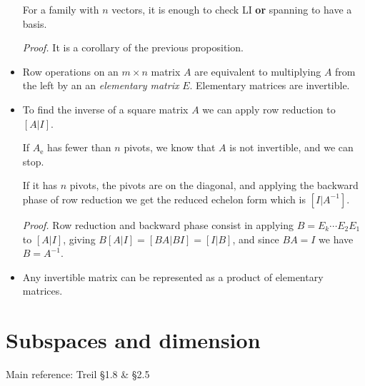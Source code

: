 \documentclass[11pt]{article}
\newcommand{\1}{\mathbf{1}}
\newcommand{\e}{{\mathrm{e}}}
\newcommand{\0}{\mathbf{0}}
\begin{document}
\begin{itemize}
For a family with $n$ vectors, it is enough to check LI \textbf{or} spanning to have a basis.

\emph{Proof.}
It is a corollary of the previous proposition.

\item

Row operations on an $m \times n$ matrix $A$ are equivalent to multiplying $A$ from the left by an an \emph{elementary matrix} $E$.
Elementary matrices are invertible.

\item

To find the inverse of a square matrix $A$ we can apply row reduction to $[A|I]$.

If $A_\e$ has fewer than $n$ pivots, we know that $A$ is not invertible, and we can stop.

If it has $n$ pivots, the pivots are on the diagonal, and applying the backward phase of row reduction we get the reduced echelon form which is $[I|A^{-1}]$.

\emph{Proof.}
Row reduction and backward phase consist in applying $B=E_k \cdots E_2 E_1$ to $[A|I]$, giving $B[A|I]=[BA|BI]=[I|B]$, and since $BA=I$ we have $B=A^{-1}$.

\item

Any invertible matrix can be represented as a product of elementary matrices.

\end{itemize}


\clearpage
\section{Subspaces and dimension}

Main reference:
Treil
\S1.8
\& 
\S2.5
\end{document}
